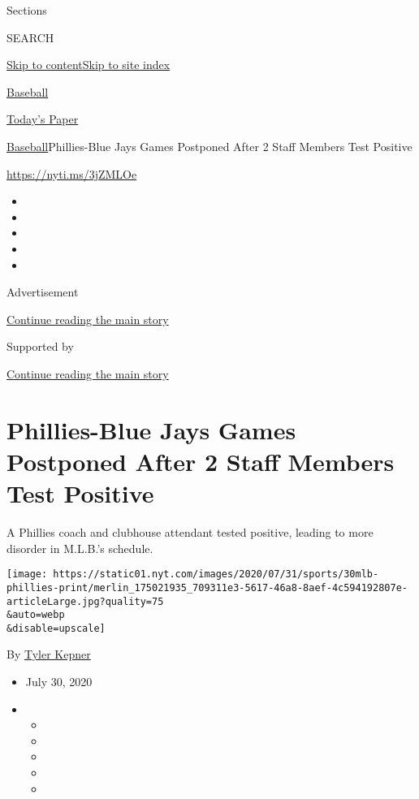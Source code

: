 Sections

SEARCH

\protect\hyperlink{site-content}{Skip to
content}\protect\hyperlink{site-index}{Skip to site index}

\href{https://www.nytimes.com/section/sports/baseball}{Baseball}

\href{https://myaccount.nytimes.com/auth/login?response_type=cookie\&client_id=vi}{}

\href{https://www.nytimes.com/section/todayspaper}{Today's Paper}

\href{/section/sports/baseball}{Baseball}\textbar{}Phillies-Blue Jays
Games Postponed After 2 Staff Members Test Positive

\url{https://nyti.ms/3jZMLOe}

\begin{itemize}
\item
\item
\item
\item
\item
\end{itemize}

Advertisement

\protect\hyperlink{after-top}{Continue reading the main story}

Supported by

\protect\hyperlink{after-sponsor}{Continue reading the main story}

\hypertarget{phillies-blue-jays-games-postponed-after-2-staff-members-test-positive}{%
\section{Phillies-Blue Jays Games Postponed After 2 Staff Members Test
Positive}\label{phillies-blue-jays-games-postponed-after-2-staff-members-test-positive}}

A Phillies coach and clubhouse attendant tested positive, leading to
more disorder in M.L.B.'s schedule.

\texttt{[image: https://static01.nyt.com/images/2020/07/31/sports/30mlb-phillies-print/merlin\_175021935\_709311e3-5617-46a8-8aef-4c594192807e-articleLarge.jpg?quality=75\\\&auto=webp\\\&disable=upscale]}

By \href{https://www.nytimes.com/by/tyler-kepner}{Tyler Kepner}

\begin{itemize}
\item
  July 30, 2020
\item
  \begin{itemize}
  \item
  \item
  \item
  \item
  \item
  \end{itemize}
\end{itemize}

